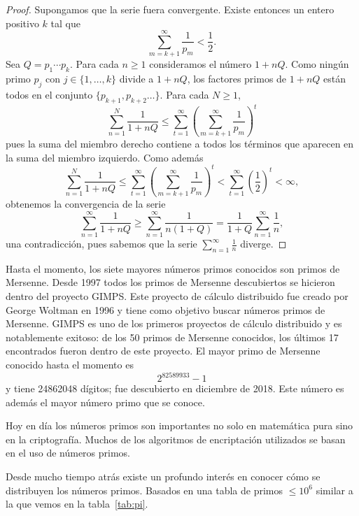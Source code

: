\begin{proof}
	Supongamos que la serie fuera convergente. Existe entonces un entero positivo $k$ tal que 
	\[
		\sum_{m=k+1}^{\infty}\frac{1}{p_m}<\frac12.
	\]
	Sea $Q=p_1\cdots p_k$. Para cada $n\geq1$ consideramos el número $1+nQ$.
	Como ningún primo $p_j$ con $j\in\{1,\dots,k\}$ divide a $1+nQ$, los
	factores primos de $1+nQ$ están todos en el conjunto $\{p_{k+1},p_{k+2}\dots\}$. Para cada $N\geq1$, 
	\[
		\sum_{n=1}^N\frac{1}{1+nQ}\leq \sum_{t=1}^\infty\left(\sum_{m=k+1}^{\infty}\frac{1}{p_m}\right)^t
	\]
	pues la suma del miembro derecho contiene a todos los términos que aparecen
	en la suma del miembro izquierdo. Como además 
	\[
		\sum_{n=1}^N\frac{1}{1+nQ}\leq \sum_{t=1}^\infty\left(\sum_{m=k+1}^{\infty}\frac{1}{p_m}\right)^t<\sum_{t=1}^\infty\left(\frac12\right)^t<\infty,
	\]
	obtenemos la convergencia de la serie 
	\[
		\sum_{n=1}^{\infty}\frac{1}{1+nQ}\geq\sum_{n=1}^\infty\frac{1}{n(1+Q)}=\frac{1}{1+Q}\sum_{n=1}^\infty\frac{1}{n},
	\]
	una contradicción, pues sabemos que la serie $\sum_{n=1}^\infty\frac{1}{n}$ diverge.
\end{proof}

Hasta el momento, los siete mayores números primos conocidos son primos de Mersenne. 
Desde 1997 todos los primos de Mersenne descubiertos se hicieron dentro del
proyecto GIMPS. Este proyecto de cálculo distribuido fue creado por George
Woltman en 1996 y tiene como objetivo buscar números primos de Mersenne. GIMPS
es uno de los primeros proyectos de cálculo distribuido y es notablemente
exitoso: de los 50 primos de Mersenne conocidos, los últimos 17 encontrados
fueron dentro de este proyecto.  El mayor primo de Mersenne conocido hasta el
momento es 
\[
	2^{82589933}-1
\]
y tiene 24862048 dígitos; fue descubierto en diciembre de 2018. Este número es
además el mayor número primo que se conoce. 

Hoy en día los números primos son importantes no solo en matemática pura sino
en la criptografía. Muchos de los algoritmos de encriptación utilizados se
basan en el uso de números primos. 

Desde mucho tiempo atrás existe un profundo interés en conocer cómo se
distribuyen los números primos. Basados en una tabla de primos $\leq10^6$
similar a la que vemos en la tabla~\ref{tab:pi}.

